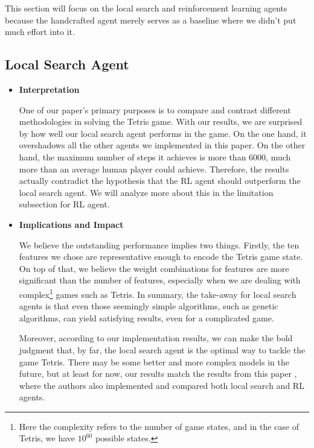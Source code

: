 \documentclass[letterpaper]{article} %
\begin{document}
This section will focus on the local search and reinforcement learning agents because the handcrafted agent merely serves as a baseline where we didn't put much effort into it. 

\subsection{Local Search Agent}
\begin{itemize}
\item \textbf{Interpretation}
  
One of our paper's primary purposes is to compare and contrast different methodologies in solving the Tetris game. With our results, we are surprised by how well our local search agent performs in the game. On the one hand, it overshadows all the other agents we implemented in this paper. On the other hand, the maximum number of steps it achieves is more than 6000, much more than an average human player could achieve. Therefore, the results actually contradict the hypothesis that the RL agent should outperform the local search agent. We will analyze more about this in the limitation subsection for RL agent.

\item \textbf{Implications and Impact}

We believe the outstanding performance implies two things. Firstly, the ten features we chose are representative enough to encode the Tetris game state. On top of that, we believe the weight combinations for features are more significant than the number of features, especially when we are dealing with complex\footnote{Here the complexity refers to the number of game states, and in the case of Tetris, we have $10^{60}$ possible states.} games such as Tetris. In summary, the take-away for local search agents is that even those seemingly simple algorithms, such as genetic algorithms, can yield satisfying results, even for a complicated game.

Moreover, according to our implementation results, we can make the bold judgment that, by far, the local search agent is the optimal way to tackle the game Tetris. There may be some better and more complex models in the future, but at least for now, our results match the results from this paper \cite{rlaga}, where the authors also implemented and compared both local search and RL agents.
  


\end{itemize}
\end{document}

